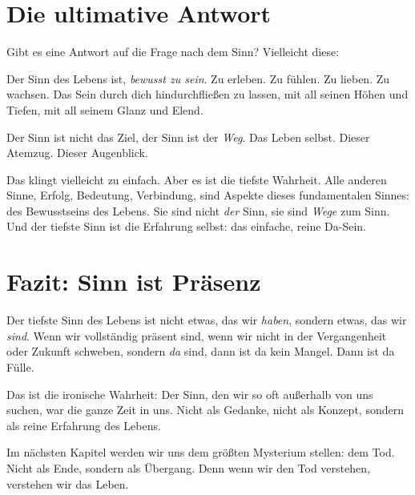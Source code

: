 \section{Die ultimative Antwort}

Gibt es eine Antwort auf die Frage nach dem Sinn? Vielleicht diese:

Der Sinn des Lebens ist, \emph{bewusst zu sein}. Zu erleben. Zu fühlen. Zu lieben. Zu wachsen. Das Sein durch dich hindurchfließen zu lassen, mit all seinen Höhen und Tiefen, mit all seinem Glanz und Elend.

Der Sinn ist nicht das Ziel, der Sinn ist der \emph{Weg}. Das Leben selbst. Dieser Atemzug. Dieser Augenblick.

Das klingt vielleicht zu einfach. Aber es ist die tiefste Wahrheit. Alle anderen Sinne, Erfolg, Bedeutung, Verbindung, sind Aspekte dieses fundamentalen Sinnes: des Bewusstseins des Lebens. Sie sind nicht \emph{der} Sinn, sie sind \emph{Wege} zum Sinn. Und der tiefste Sinn ist die Erfahrung selbst: das einfache, reine Da-Sein.

\section{Fazit: Sinn ist Präsenz}

Der tiefste Sinn des Lebens ist nicht etwas, das wir \emph{haben}, sondern etwas, das wir \emph{sind}. Wenn wir vollständig präsent sind, wenn wir nicht in der Vergangenheit oder Zukunft schweben, sondern \emph{da} sind, dann ist da kein Mangel. Dann ist da Fülle.

Das ist die ironische Wahrheit: Der Sinn, den wir so oft außerhalb von uns suchen, war die ganze Zeit in uns. Nicht als Gedanke, nicht als Konzept, sondern als reine Erfahrung des Lebens.

Im nächsten Kapitel werden wir uns dem größten Mysterium stellen: dem Tod. Nicht als Ende, sondern als Übergang. Denn wenn wir den Tod verstehen, verstehen wir das Leben.
